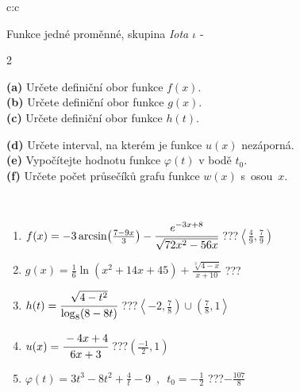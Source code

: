 \documentclass[10pt]{report}
\begin{document}
\begin{tabular}{c:c}
\begin{minipage}[c][104.5mm][t]{0.5\linewidth}
\begin{center}
\vspace{7mm}
{\huge Funkce jedné proměnné, skupina \textit{Iota $\iota$} -}\\[5mm]
\begin{minipage}{0.95\linewidth}
\begin{center}
{\small \begin{multicols}{2} \raggedright
\textbf{(a)} Určete definiční obor funkce \(f(x)\). \\[1mm]
\textbf{(b)} Určete definiční obor funkce \(g(x)\). \\[1mm]
\textbf{(c)} Určete definiční obor funkce \(h(t)\). \par \columnbreak
\textbf{(d)} Určete interval, na kterém je funkce \(u(x)\) nezáporná. \\[1mm]
\textbf{(e)} Vypočítejte hodnotu funkce \(\varphi(t)\) v bodě \(t_0\). \\[1mm]
\textbf{(f)} Určete počet průsečíků grafu funkce \(w(x)\) s~osou~\(x\). \\[1mm]
\end{multicols}
}
\end{center}
\end{minipage}
\\[4mm]
\begin{minipage}{0.79\linewidth}
\begin{center}
\begin{varwidth}{\linewidth}
\begin{enumerate}
\small
\item $f(x) = -3\arcsin\!\left( \frac{7-9x}{3} \right) - \cfrac{e^{-3x+8}}{\sqrt{72x^2-56x}}$\quad \dotfill\; ???\;\dotfill \quad $\left\langle\frac{4}{9} , \frac{7}{9}\right)$
\item $g(x) = \frac{1}{6} \ln{\!(x^2+14x+45)}+\frac{\sqrt[3]{4-x}}{x+10}$\quad \dotfill\; ???\;\dotfill {}
\item $h(t) = \cfrac{\sqrt{4-t^2}}{\log_8(8-8t)}$\quad \dotfill\; ???\;\dotfill \quad $\left\langle-2 , \frac{7}{8}\right)\cup\left(\frac{7}{8} , 1\right\rangle$
\item $u(x) = \cfrac{-4x+4}{6x+3}$\quad \dotfill\; ???\;\dotfill \quad $\left(\frac{-1}{2} , 1\right)$
\item $\varphi(t) = 3t^3-8t^2+\frac{4}{t}-9 \enspace , \enspace t_0=-\frac{1}{2}$\quad \dotfill\; ???\;\dotfill \quad $-\frac{107}{8}$

\end{enumerate}
\end{varwidth}
\end{center}
\end{minipage}
\end{center}
\end{minipage}
\end{tabular}
\end{document}
